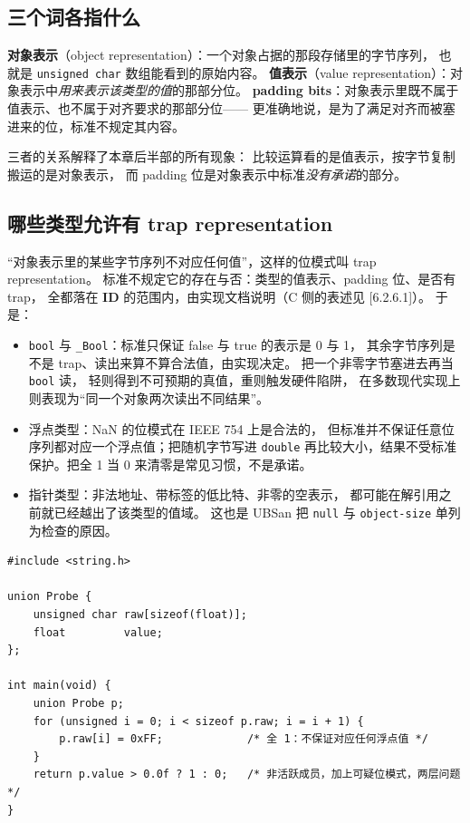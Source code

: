 \documentclass[12pt,a4paper,fontset=fandol]{ctexbook}
\newcommand{\Tp}[1]{\texttt{#1}}
\newcommand{\IDB}{\textbf{\textsf{ID}}}
\newcommand{\Std}[1]{\textsc{[#1]}}
\begin{document}
\subsection{三个词各指什么}\label{sec:ub04-three-words}

\textbf{对象表示}（object representation）：一个对象占据的那段存储里的字节序列，
也就是 \Tp{unsigned char} 数组能看到的原始内容。
\textbf{值表示}（value representation）：对象表示中\emph{用来表示该类型的值}的那部分位。
\textbf{padding bits}：对象表示里既不属于值表示、也不属于对齐要求的那部分位——
更准确地说，是为了满足对齐而被塞进来的位，标准不规定其内容。

三者的关系解释了本章后半部的所有现象：
比较运算看的是值表示，按字节复制搬运的是对象表示，
而 padding 位是对象表示中标准\emph{没有承诺}的部分。

\subsection{哪些类型允许有 trap representation}\label{sec:ub04-trap-reps}

“对象表示里的某些字节序列不对应任何值”，这样的位模式叫 trap representation。
标准不规定它的存在与否：类型的值表示、padding 位、是否有 trap，
全都落在 \IDB{} 的范围内，由实现文档说明（C 侧的表述见 \Std{6.2.6.1}）。
于是：

\begin{itemize}
\item \Tp{bool} 与 \Tp{\_Bool}：标准只保证 false 与 true 的表示是 0 与 1，
      其余字节序列是不是 trap、读出来算不算合法值，由实现决定。
      把一个非零字节塞进去再当 \Tp{bool} 读，
      轻则得到不可预期的真值，重则触发硬件陷阱，
      在多数现代实现上则表现为“同一个对象两次读出不同结果”。
\item 浮点类型：NaN 的位模式在 IEEE 754 上是合法的，
      但标准并不保证任意位序列都对应一个浮点值；把随机字节写进 \Tp{double}
      再比较大小，结果不受标准保护。把全 1 当 0 来清零是常见习惯，不是承诺。
\item 指针类型：非法地址、带标签的低比特、非零的空表示，
      都可能在解引用之前就已经越出了该类型的值域。
      这也是 UBSan 把 \Tp{null} 与 \Tp{object-size} 单列为检查的原因。
\end{itemize}

\begin{lstlisting}[style=cstyle, caption={把未经承诺的位模式写进值域很窄的类型}]
#include <string.h>

union Probe {
    unsigned char raw[sizeof(float)];
    float         value;
};

int main(void) {
    union Probe p;
    for (unsigned i = 0; i < sizeof p.raw; i = i + 1) {
        p.raw[i] = 0xFF;             /* 全 1：不保证对应任何浮点值 */
    }
    return p.value > 0.0f ? 1 : 0;   /* 非活跃成员，加上可疑位模式，两层问题 */
}
\end{lstlisting}
\end{document}
